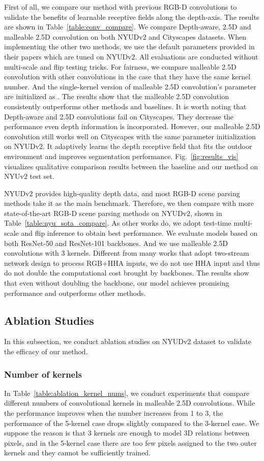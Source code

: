 \documentclass[runningheads]{llncs}
\begin{document}
First of all, we compare our method with previous RGB-D convolutions to validate the benefits of learnable receptive fields along the depth-axis.
The results are shown in Table~\ref{table:conv_compare}.
We compare Depth-aware, 2.5D and malleable 2.5D convolution on both NYUDv2 and Cityscapes datasets.
When implementing the other two methods, we use the default parameters provided in their papers\cite{DepthAware,2_5D} which are tuned on NYUDv2.
All evaluations are conducted without multi-scale and flip testing tricks.
For fairness, we compare malleable 2.5D convolution with other convolutions in the case that they have the same kernel number.
And the single-kernel version of malleable 2.5D convolution's parameter  are initialized as .
The results show that the malleable 2.5D convolution consistently outperforms other methods and baselines.
It is worth noting that Depth-aware and 2.5D convolutions fail on Cityscapes.
They decrease the performance even depth information is incorporated.
However, our malleable 2.5D convolution still works well on Cityscapes with the same parameter initialization on NYUDv2.
It adaptively learns the depth receptive field that fits the outdoor environment and improves segmentation performance.
Fig.~\ref{fig:results_vis} visualizes qualitative comparison results between the baseline and our method on NYUv2 test set.

NYUDv2 provides high-quality depth data, and most RGB-D scene parsing methods take it as the main benchmark.
Therefore, we then compare with more state-of-the-art RGB-D scene parsing methods on NYUDv2, shown in Table~\ref{table:nyu_sota_compare}.
As other works do\cite{RDFNet,2_5D,Coupling}, we adopt test-time multi-scale and flip inference to obtain best performance.
We evaluate models based on both ResNet-50 and ResNet-101 backbones.
And we use malleable 2.5D convolutions with 3 kernels.
Different from many works that adopt two-stream network design to process RGB+HHA inputs, we do not use HHA input and thus do not double the computational cost brought by backbones.
The results show that even without doubling the backbone, our model achieves promising performance and outperforms other methods.

\subsection{Ablation Studies}
In this subsection, we conduct ablation studies on NYUDv2 dataset to validate the efficacy of our method.

\subsubsection{Number of kernels}
In Table~\ref{table:ablation_kernel_nums}, we conduct experiments that compare different numbers of convolutional kernels in malleable 2.5D convolutions.
While the performance improves when the number increases from 1 to 3, the performance of the 5-kernel case drops slightly compared to the 3-kernel case.
We suppose the reason is that 3 kernels are enough to model 3D relations between pixels, and in the 5-kernel case there are too few pixels assigned to the two outer kernels and they cannot be sufficiently trained.
\end{document}

